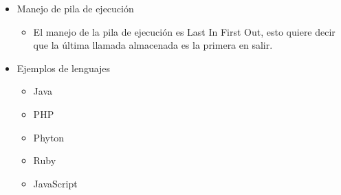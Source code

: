 \documentclass[10pt]{article}
\begin{document}
\begin{itemize}
\begin{itemize}
  	\end{itemize}
  \item Manejo de pila de ejecución
    \begin{itemize}
      \item El manejo de la pila de ejecución es Last In First Out, esto quiere decir que la última llamada almacenada es la primera en salir.
    \end{itemize}
  \item Ejemplos de lenguajes
    \begin{itemize}
      \item Java
      \item PHP
      \item Phyton
      \item Ruby
      \item JavaScript
    \end{itemize}
\end{itemize}
\end{document}

